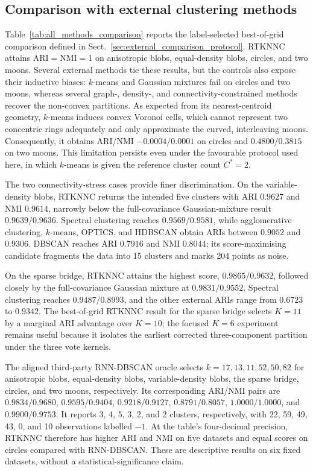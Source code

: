 \documentclass[review,12pt]{elsarticle}
\begin{document}
\subsection{Comparison with external clustering methods}
\label{sec:baseline_comparison}

Table~\ref{tab:all_methods_comparison} reports the label-selected best-of-grid
comparison defined in Sect.~\ref{sec:external_comparison_protocol}. RTKNNC attains
ARI${}={}$NMI${}={}$1 on anisotropic blobs, equal-density blobs, circles, and
two moons.  Several external methods tie these results, but the controls also
expose their inductive biases: $k$-means and Gaussian mixtures fail on circles
and two moons, whereas several graph-, density-, and connectivity-constrained
methods recover the non-convex partitions. As expected from its nearest-centroid
geometry, $k$-means induces convex Voronoi cells, which cannot represent two
concentric rings adequately and only approximate the curved, interleaving
moons.  Consequently, it obtains ARI/NMI
$-0.0004/0.0001$ on circles and $0.4800/0.3815$ on two moons.  This limitation
persists even under the favourable protocol used here, in which $k$-means is
given the reference cluster count $C^*=2$.

The two connectivity-stress cases provide finer discrimination.  On the
variable-density blobs, RTKNNC returns the intended five clusters with ARI
$0.9627$ and NMI $0.9614$, narrowly below the full-covariance Gaussian-mixture
result $0.9639/0.9636$.  Spectral clustering reaches $0.9569/0.9581$, while
agglomerative clustering, $k$-means, OPTICS, and HDBSCAN obtain ARIs between
$0.9052$ and $0.9306$.  DBSCAN reaches ARI $0.7916$ and NMI $0.8044$; its
score-maximising candidate fragments the data into 15 clusters and marks 204
points as noise.

On the sparse bridge, RTKNNC attains the highest score,
$0.9865/0.9632$, followed closely by the full-covariance Gaussian mixture at
$0.9831/0.9552$.  Spectral clustering reaches $0.9487/0.8993$, and the other
external ARIs range from $0.6723$ to $0.9342$. The best-of-grid RTKNNC result
for the sparse bridge selects $K=11$ by a marginal ARI advantage over $K=10$;
the focused $K=6$ experiment remains useful because it isolates the earliest
corrected three-component partition under the three vote kernels.

The aligned third-party RNN-DBSCAN oracle selects $k=17,\allowbreak 13,\allowbreak 11,\allowbreak 52,\allowbreak 50,\allowbreak 82$ for
anisotropic blobs, equal-density blobs, variable-density blobs, the sparse
bridge, circles, and two moons, respectively. Its corresponding ARI/NMI
pairs are $0.9834/0.9680$, $0.9595/0.9404$, $0.9218/0.9127$,
$0.8791/0.8057$, $1.0000/1.0000$, and $0.9900/0.9753$.
It reports 3, 4, 5, 3, 2, and 2 clusters, respectively, with 22, 59, 49, 43,
0, and 10 observations labelled $-1$. At the table's four-decimal precision,
RTKNNC therefore has higher ARI and NMI on five datasets and equal scores on
circles compared with RNN-DBSCAN. These are descriptive results on six
fixed datasets, without a statistical-significance claim.
\end{document}
